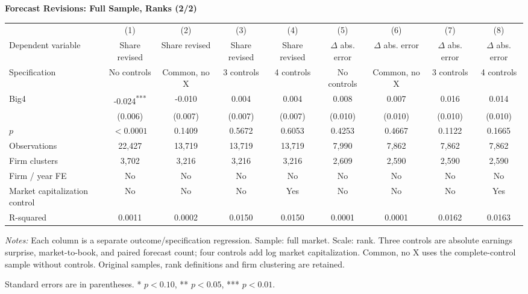 \documentclass[10pt]{article}
\newcommand{\sym}[1]{\textsuperscript{#1}}
\begin{document}
\begin{minipage}{28.80cm}
\fontsize{10}{12}\selectfont
\setlength{\tabcolsep}{4pt}\renewcommand{\arraystretch}{1.08}
{\large\bfseries Forecast Revisions: Full Sample, Ranks (2/2)}\par\medskip
\begin{tabular*}{\linewidth}{@{\extracolsep{\fill}}lcccccccc@{}}
\toprule
 & (1) & (2) & (3) & (4) & (5) & (6) & (7) & (8) \\
Dependent variable & Share revised & Share revised & Share revised & Share revised & $\Delta$ abs. error & $\Delta$ abs. error & $\Delta$ abs. error & $\Delta$ abs. error \\
Specification & No controls & Common, no X & 3 controls & 4 controls & No controls & Common, no X & 3 controls & 4 controls \\
\midrule
Big4 & -0.024\sym{***} & -0.010 & 0.004 & 0.004 & 0.008 & 0.007 & 0.016 & 0.014 \\
 & (0.006) & (0.007) & (0.007) & (0.007) & (0.010) & (0.010) & (0.010) & (0.010) \\
$p$ & $<0.0001$ & 0.1409 & 0.5672 & 0.6053 & 0.4253 & 0.4667 & 0.1122 & 0.1665 \\
\midrule
Observations & 22,427 & 13,719 & 13,719 & 13,719 & 7,990 & 7,862 & 7,862 & 7,862 \\
Firm clusters & 3,702 & 3,216 & 3,216 & 3,216 & 2,609 & 2,590 & 2,590 & 2,590 \\
Firm / year FE & No & No & No & No & No & No & No & No \\
Market capitalization control & No & No & No & Yes & No & No & No & Yes \\
R-squared & 0.0011 & 0.0002 & 0.0150 & 0.0150 & 0.0001 & 0.0001 & 0.0162 & 0.0163 \\
\bottomrule\end{tabular*}\par\medskip
\fontsize{9}{11}\selectfont\textit{Notes:} Each column is a separate outcome/specification regression. Sample: full market. Scale: rank. Three controls are absolute earnings surprise, market-to-book, and paired forecast count; four controls add log market capitalization. Common, no X uses the complete-control sample without controls. Original samples, rank definitions and firm clustering are retained.
\par Standard errors are in parentheses. * $p<0.10$, ** $p<0.05$, *** $p<0.01$.
\end{minipage}
\end{document}
